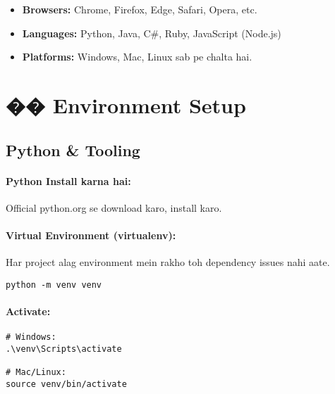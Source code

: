 \documentclass[a4paper,12pt]{article}
\begin{document}
\begin{itemize}[leftmargin=*]
  \item \textbf{Browsers:} Chrome, Firefox, Edge, Safari, Opera, etc.
  \item \textbf{Languages:} Python, Java, C\#, Ruby, JavaScript (Node.js)
  \item \textbf{Platforms:} Windows, Mac, Linux sab pe chalta hai.
\end{itemize}

\vspace{0.5cm}

\section{��️  Environment Setup}

\subsection{Python \& Tooling}

\paragraph{Python Install karna hai:}
Official python.org se download karo, install karo.

\paragraph{Virtual Environment (virtualenv):}
Har project alag environment mein rakho toh dependency issues nahi aate.

\begin{tcolorbox}[colback=codebg, colframe=black!20, boxrule=0.5pt, sharp corners, title={Virtual Environment Creation Example}]
\begin{lstlisting}[language=BashShell]
python -m venv venv
\end{lstlisting}
\end{tcolorbox}

\paragraph{Activate:}

\begin{tcolorbox}[colback=codebg, colframe=black!20, boxrule=0.5pt, sharp corners, title={Activate Virtual Environment}]
\begin{lstlisting}[language=BashShell]
# Windows:
.\venv\Scripts\activate

# Mac/Linux:
source venv/bin/activate
\end{lstlisting}
\end{tcolorbox}
\end{document}
